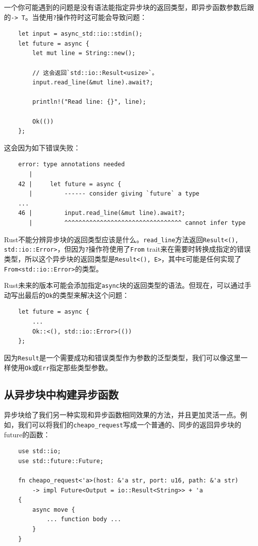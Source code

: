 一个你可能遇到的问题是没有语法能指定异步块的返回类型，即异步函数参数后跟的\texttt{-> T}。当使用\texttt{?}操作符时这可能会导致问题：
\begin{verbatim}
    let input = async_std::io::stdin();
    let future = async {
        let mut line = String::new();

        // 这会返回`std::io::Result<usize>`。
        input.read_line(&mut line).await?;

        println!("Read line: {}", line);

        Ok(())
    };
\end{verbatim}

这会因为如下错误失败：
\begin{verbatim}
    error: type annotations needed
       |
    42 |     let future = async {
       |         ------ consider giving `future` a type
    ...
    46 |         input.read_line(&mut line).await?;
       |         ^^^^^^^^^^^^^^^^^^^^^^^^^^^^^^^^^ cannot infer type
\end{verbatim}

Rust不能分辨异步块的返回类型应该是什么。\texttt{read\_line}方法返回\texttt{Result<(), std::io::Error>}，但因为\texttt{?}操作符使用了\texttt{From} trait来在需要时转换成指定的错误类型，所以这个异步块的返回类型是\texttt{Result<(), E>}，其中\texttt{E}可能是任何实现了\texttt{From<std::io::Error>}的类型。

Rust未来的版本可能会添加指定\texttt{async}块的返回类型的语法。但现在，可以通过手动写出最后的\texttt{Ok}的类型来解决这个问题：
\begin{verbatim}
    let future = async {
        ...
        Ok::<(), std::io::Error>(())
    };
\end{verbatim}

因为\texttt{Result}是一个需要成功和错误类型作为参数的泛型类型，我们可以像这里一样使用\texttt{Ok}或\texttt{Err}指定那些类型参数。

\subsection{从异步块中构建异步函数}
异步块给了我们另一种实现和异步函数相同效果的方法，并且更加灵活一点。例如，我们可以将我们的\texttt{cheapo\_request}写成一个普通的、同步的返回异步块的future的函数：
\begin{verbatim}
    use std::io;
    use std::future::Future;

    fn cheapo_request<'a>(host: &'a str, port: u16, path: &'a str)
        -> impl Future<Output = io::Result<String>> + 'a
    {
        async move {
            ... function body ...
        }
    }
\end{verbatim}

